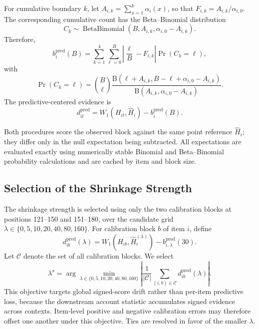 For cumulative boundary $k$, let
$A_{i,k}=\sum_{x=1}^{k}\alpha_i(x)$, so that
$F_{i,k}=A_{i,k}/\alpha_{i,0}$.
The corresponding cumulative count has the Beta--Binomial distribution
\[
C_k
\sim
\operatorname{BetaBinomial}
\left(
B,
A_{i,k},
\alpha_{i,0}-A_{i,k}
\right).
\]
Therefore,
\begin{equation}
\label{eq:supp-predictive-expectation}
b_i^{\mathrm{pred}}(B)
=
\sum_{k=1}^{4}
\sum_{\ell=0}^{B}
\left|
\frac{\ell}{B}-F_{i,k}
\right|
\Pr(C_k=\ell),
\end{equation}
with
\begin{equation}
\label{eq:supp-beta-binomial-pmf}
\Pr(C_k=\ell)
=
\binom{B}{\ell}
\frac{
\mathrm{B}
\left(
\ell+A_{i,k},
B-\ell+\alpha_{i,0}-A_{i,k}
\right)
}{
\mathrm{B}
\left(
A_{i,k},
\alpha_{i,0}-A_{i,k}
\right)
}.
\end{equation}
The predictive-centered evidence is
\begin{equation}
\label{eq:supp-predictive-centered}
d_{it}^{\mathrm{pred}}
=
W_1(H_{it},\widehat H_i)
-
b_i^{\mathrm{pred}}(B).
\end{equation}

Both procedures score the observed block against the same point reference
$\widehat H_i$; they differ only in the null expectation being subtracted.
All expectations are evaluated exactly using numerically stable Binomial and
Beta--Binomial probability calculations and are cached by item and block size.


\subsection{Selection of the Shrinkage Strength}
\label{sec:supp-lambda}

The shrinkage strength is selected using only the two calibration blocks at
positions 121--150 and 151--180, over the candidate grid
$\lambda\in\{0,5,10,20,40,80,160\}$.
For calibration block $b$ of item $i$, define
\[
d_{ib}^{\mathrm{pred}}(\lambda)
=
W_1\!\left(
H_{ib},
\widehat H_i^{(\lambda)}
\right)
-
b_{i,\lambda}^{\mathrm{pred}}(30).
\]
Let $\mathcal C$ denote the set of all calibration blocks. We select
\begin{equation}
\label{eq:supp-lambda-objective}
\lambda^\star
=
\arg\min_{\lambda\in\{0,5,10,20,40,80,160\}}
\left|
\frac{1}{|\mathcal C|}
\sum_{(i,b)\in\mathcal C}
d_{ib}^{\mathrm{pred}}(\lambda)
\right|.
\end{equation}
This objective targets global signed-score drift rather than
per-item predictive loss, because the downstream account statistic
accumulates signed evidence across contexts. Item-level positive and
negative calibration errors may therefore offset one another under
this objective.
Ties are resolved in favor of the smaller $\lambda$.

